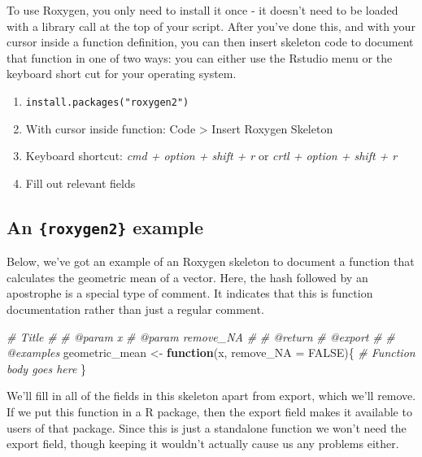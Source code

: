 \documentclass[
  12pt,
]{book}
\newenvironment{Shaded}{\begin{snugshade}}{\end{snugshade}}
\newcommand{\AttributeTok}[1]{\textcolor[rgb]{0.77,0.63,0.00}{#1}}
\newcommand{\CommentTok}[1]{\textcolor[rgb]{0.56,0.35,0.01}{\textit{#1}}}
\newcommand{\ConstantTok}[1]{\textcolor[rgb]{0.00,0.00,0.00}{#1}}
\newcommand{\ControlFlowTok}[1]{\textcolor[rgb]{0.13,0.29,0.53}{\textbf{#1}}}
\newcommand{\NormalTok}[1]{#1}
\newcommand{\OtherTok}[1]{\textcolor[rgb]{0.56,0.35,0.01}{#1}}
\providecommand{\tightlist}{%
  \setlength{\itemsep}{0pt}\setlength{\parskip}{0pt}}
\begin{document}
To use Roxygen, you only need to install it once - it doesn't need to be loaded with a library call at the top of your script. After you've done this, and with your cursor inside a function definition, you can then insert skeleton code to document that function in one of two ways: you can either use the Rstudio menu or the keyboard short cut for your operating system.

\begin{enumerate}
\def\labelenumi{\arabic{enumi}.}
\tightlist
\item
  \texttt{install.packages("roxygen2")}
\item
  With cursor inside function: Code \textgreater{} Insert Roxygen Skeleton
\item
  Keyboard shortcut: \emph{cmd + option + shift + r} or \emph{crtl + option + shift + r}
\item
  Fill out relevant fields
\end{enumerate}

\hypertarget{an-roxygen2-example}{%
\subsection{\texorpdfstring{An \texttt{\{roxygen2\}} example}{An \{roxygen2\} example}}\label{an-roxygen2-example}}

Below, we've got an example of an Roxygen skeleton to document a function that calculates the geometric mean of a vector. Here, the hash followed by an apostrophe is a special type of comment. It indicates that this is function documentation rather than just a regular comment.

\begin{Shaded}
\begin{Highlighting}[]
\CommentTok{\#\textquotesingle{} Title}
\CommentTok{\#\textquotesingle{}}
\CommentTok{\#\textquotesingle{} @param x }
\CommentTok{\#\textquotesingle{} @param remove\_NA }
\CommentTok{\#\textquotesingle{}}
\CommentTok{\#\textquotesingle{} @return}
\CommentTok{\#\textquotesingle{} @export}
\CommentTok{\#\textquotesingle{}}
\CommentTok{\#\textquotesingle{} @examples}
\NormalTok{geometric\_mean }\OtherTok{\textless{}{-}} \ControlFlowTok{function}\NormalTok{(x, }\AttributeTok{remove\_NA =} \ConstantTok{FALSE}\NormalTok{)\{}
  \CommentTok{\# Function body goes here}
\NormalTok{\}}
\end{Highlighting}
\end{Shaded}

We'll fill in all of the fields in this skeleton apart from export, which we'll remove. If we put this function in a R package, then the export field makes it available to users of that package. Since this is just a standalone function we won't need the export field, though keeping it wouldn't actually cause us any problems either.
\end{document}
